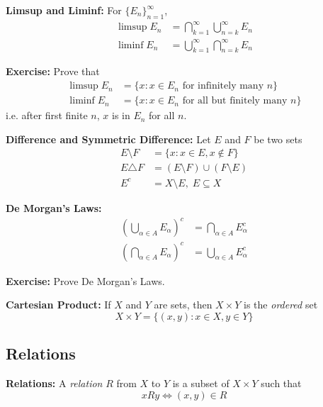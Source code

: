 \documentclass[12pt]{report}
\newcommand{\sub}{\subseteq}
\newenvironment*{exercise}[1][red]{
    \begin{tcolorbox}[
        parbox=false,
        colback=#1!5!white,
        colframe=#1!75!black,
        breakable
    ]}
    {\end{tcolorbox}}
\begin{document}
    \textbf{Limsup and Liminf:} For $\{E_n\}_{n=1}^{\infty}$,
    \begin{align*}
        \limsup E_n &= \bigcap_{k=1}^{\infty} \bigcup_{n=k}^{\infty} E_n\\ 
        \liminf E_n &= \bigcup_{k=1}^{\infty} \bigcap_{n=k}^{\infty} E_n
    \end{align*}

    \begin{exercise}
        \textbf{Exercise:} Prove that 
        \begin{align*}
            \limsup E_n &= \{x : x\in E_n \text{ for infinitely many } n\}\\
            \liminf E_n &= \{x : x\in E_n \text{ for all but finitely many } n\}
        \end{align*}
        i.e. after first finite $n$, $x$ is in $E_n$ for all $n$.
    \end{exercise}

    \textbf{Difference and Symmetric Difference:} Let $E$ and $F$ be two sets
    \begin{align*}
        E \setminus F &= \{x : x\in E, x\not\in F\}\\
        E \triangle F &= (E \setminus F) \cup (F \setminus E)\\ 
        E^c &= X \setminus E, \; E \sub X
    \end{align*}

    \textbf{De Morgan's Laws:}
    \begin{align*}
        \left(\bigcup_{\alpha \in A} E_{\alpha}\right)^c &= \bigcap_{\alpha \in A} E_{\alpha}^c\\
        \left(\bigcap_{\alpha \in A} E_{\alpha}\right)^c &= \bigcup_{\alpha \in A} E_{\alpha}^c
    \end{align*}

    \begin{exercise}
        \textbf{Exercise:} Prove De Morgan's Laws.
    \end{exercise}

    \textbf{Cartesian Product:} If $X$ and $Y$ are sets, then $X \times Y$ is the \emph{ordered} set 
    \[X \times Y = \{(x, y): x \in X, y \in Y\}\]

    \subsection*{Relations}
    \textbf{Relations:} A \emph{relation} $R$ from $X$ to $Y$ is a subset of $X \times Y$ such that 
    \[xRy \iff (x, y) \in R\]
\end{document}
